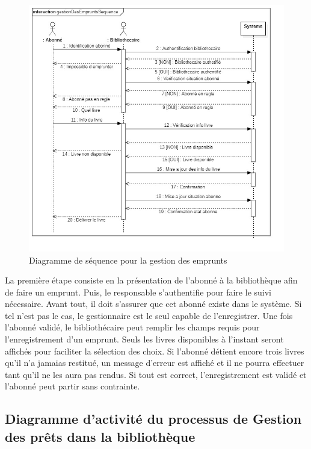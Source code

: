 \paragraph{}
\begin{figure}[h]
        \centering
        \includegraphics[width=1\textwidth]{gestionDesEmpruntsSequence}
        \caption{Diagramme de séquence pour la gestion des emprunts}
        \label{image-gestionDesEmpruntsSequence}
        \end{figure}
\par
La première étape consiste en la présentation de l'abonné à la bibliothèque afin de 
faire un emprunt. Puis, le responsable s'authentifie pour faire le suivi nécessaire. Avant 
tout, il doit s'assurer que cet abonné existe dans le système. Si tel n'est pas le cas, le 
gestionnaire est le seul capable de l'enregistrer. Une fois l'abonné validé, le 
bibliothécaire peut remplir les champs requis pour l'enregistrement d'un emprunt. Seuls 
les livres disponibles à l'instant seront affichés pour faciliter la sélection des choix.
Si l'abonné détient encore trois livres qu'il n'a jamaias restitué, un message d'erreur 
est affiché et il ne pourra effectuer tant qu'il ne les aura pas rendus. Si tout est 
correct, l'enregistrement est validé et l'abonné peut partir sans contrainte.

\subsection{Diagramme d’activité du processus de Gestion des prêts dans la bibliothèque}
